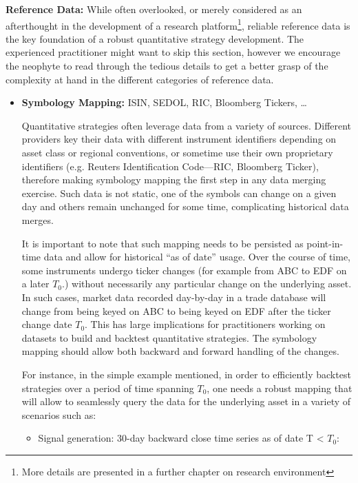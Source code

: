 \noindent\textbf{Reference Data:}  While often overlooked, or merely considered as an afterthought in the development of a research platform\footnote{More details are presented in a further chapter on research environment}, reliable reference data is the key foundation of a robust quantitative strategy development. The experienced practitioner might want to skip this section, however we encourage the neophyte to read through the tedious details to get a better grasp of the complexity at hand in the
different categories of reference data.

\begin{itemize}
\item \textbf{Symbology Mapping:} ISIN, SEDOL, RIC, Bloomberg Tickers, \dots

Quantitative strategies often leverage data from a variety of sources. Different providers key their data with different instrument identifiers depending on asset class or regional conventions, or sometime use their own proprietary identifiers (e.g. Reuters Identification Code---RIC, Bloomberg Ticker), therefore making symbology mapping the first step in any data merging exercise. Such data is not static, one of the symbols can change on a given day and others remain unchanged for some time, complicating historical data merges.


It is important to note that such mapping needs to be persisted as point-in-time data and allow for historical ``as of date'' usage. Over the course of time, some instruments undergo ticker changes (for example from ABC to EDF on a later $T_0$.) without necessarily any particular change on the underlying asset. In such cases, market data recorded day-by-day in a trade database will change from being keyed on ABC to being keyed on EDF after the ticker change date $T_0$. This has large implications for practitioners working on datasets to build and backtest quantitative strategies. The symbology mapping should allow both backward and forward handling of the changes.


For instance, in the simple example mentioned, in order to efficiently backtest strategies over a period of time spanning $T_0$, one needs a robust mapping that will allow to seamlessly query the data for the underlying asset in a variety of scenarios such as:
\begin{itemize}
\item Signal generation: 30-day backward close time series as of date T < $T_0$:

\hspace*{-0.5cm}{\tt select close from data where date in [T-30,  T], sym=ABC}


\end{itemize}
\end{itemize}
